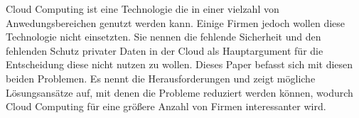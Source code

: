 Cloud Computing ist eine Technologie die in einer vielzahl von Anwedungsbereichen genutzt werden kann. Einige Firmen jedoch wollen diese Technologie nicht einsetzten. Sie nennen die fehlende Sicherheit und den fehlenden Schutz privater Daten in der Cloud als Hauptargument für die Entscheidung diese nicht nutzen zu wollen. Dieses Paper befasst sich mit diesen beiden Problemen. Es nennt die Herausforderungen und zeigt mögliche Lösungsansätze auf, mit denen die Probleme reduziert werden können, wodurch Cloud Computing für eine größere Anzahl von Firmen interessanter wird.
